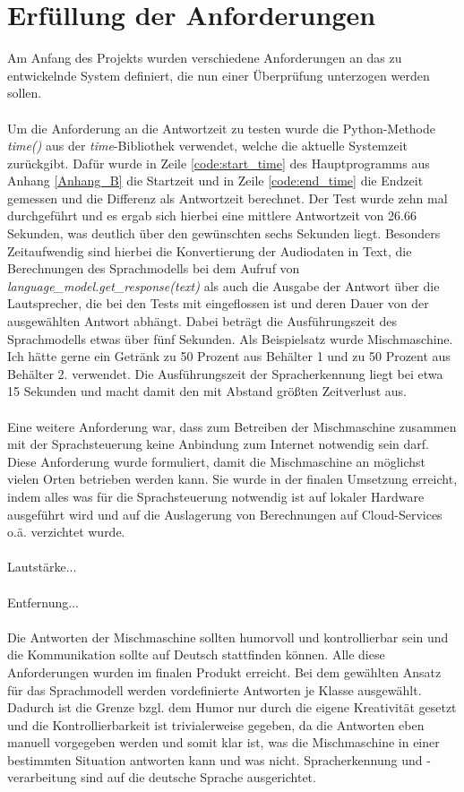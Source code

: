 \section{Erfüllung der Anforderungen}
Am Anfang des Projekts wurden verschiedene Anforderungen an das zu entwickelnde System definiert, die nun einer Überprüfung unterzogen werden sollen.\\\\
Um die Anforderung an die Antwortzeit zu testen wurde die Python-Methode \textit{time()} aus der \textit{time}-Bibliothek verwendet, welche die aktuelle Systemzeit zurückgibt. Dafür wurde in Zeile \ref{code:start_time} des Hauptprogramms aus Anhang \ref{Anhang_B} die Startzeit und in Zeile \ref{code:end_time} die Endzeit gemessen und die Differenz als Antwortzeit berechnet. Der Test wurde zehn mal durchgeführt und es ergab sich hierbei eine mittlere Antwortzeit von 26.66 Sekunden, was deutlich über den gewünschten sechs Sekunden liegt. Besonders Zeitaufwendig sind hierbei die Konvertierung der Audiodaten in Text, die Berechnungen des Sprachmodells bei dem Aufruf von \textit{language\_model.get\_response(text)} als auch die Ausgabe der Antwort über die Lautsprecher, die bei den Tests mit eingeflossen ist und deren Dauer von der ausgewählten Antwort abhängt. Dabei beträgt die Ausführungszeit des Sprachmodells etwas über fünf Sekunden. Als Beispielsatz wurde \glqq{}Mischmaschine. Ich hätte gerne ein Getränk zu 50 Prozent aus Behälter 1 und zu 50 Prozent aus Behälter 2.\grqq{} verwendet. Die Ausführungszeit der Spracherkennung liegt bei etwa 15 Sekunden und macht damit den mit Abstand größten Zeitverlust aus.\\\\
Eine weitere Anforderung war, dass zum Betreiben der Mischmaschine zusammen mit der Sprachsteuerung keine Anbindung zum Internet notwendig sein darf. Diese Anforderung wurde formuliert, damit die Mischmaschine an möglichst vielen Orten betrieben werden kann. Sie wurde in der finalen Umsetzung erreicht, indem alles was für die Sprachsteuerung notwendig ist auf lokaler Hardware ausgeführt wird und auf die Auslagerung von Berechnungen auf Cloud-Services o.ä. verzichtet wurde.\\\\
Lautstärke...\\\\
Entfernung...\\\\
Die Antworten der Mischmaschine sollten humorvoll und kontrollierbar sein und die Kommunikation sollte auf Deutsch stattfinden können. Alle diese Anforderungen wurden im finalen Produkt erreicht. Bei dem gewählten Ansatz für das Sprachmodell werden vordefinierte Antworten je Klasse ausgewählt. Dadurch ist die Grenze bzgl. dem Humor nur durch die eigene Kreativität gesetzt und die Kontrollierbarkeit ist trivialerweise gegeben, da die Antworten eben manuell vorgegeben werden und somit klar ist, was die Mischmaschine in einer bestimmten Situation antworten kann und was nicht. Spracherkennung und -verarbeitung sind auf die deutsche Sprache ausgerichtet.\\\\
